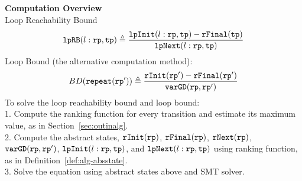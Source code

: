 \textbf{Computation Overview}
\\
 Loop Reachability Bound
\[
  \mathtt{lpRB}(l: \mathtt{rp}, \mathtt{tp}) \triangleq
    \frac{\mathtt{lpInit}(l: \mathtt{rp}, \mathtt{tp}) - \mathtt{rFinal}(\mathtt{tp})}{\mathtt{lpNext}(l: \mathtt{rp}, \mathtt{tp})}
\]
 Loop Bound (the alternative computation method):
  \[
    BD(\mathtt{repeat}(\mathtt{rp}')) \triangleq
    \frac{\mathtt{rInit}(\mathtt{rp}') - \mathtt{rFinal}(\mathtt{rp}')}{\mathtt{varGD}(\mathtt{rp}, \mathtt{rp}')}
\]
  To solve the loop reachability bound and loop bound:
  \\
  1. Compute the ranking function for every transition and estimate its maximum value, as in Section~\ref{sec:outinalg}.
  \\
  2. Compute the abstract states,
  $\mathtt{rInit}(\mathtt{rp})$, $\mathtt{rFinal}(\mathtt{rp})$, $\mathtt{rNext}(\mathtt{rp})$, $\mathtt{varGD}(\mathtt{rp}, \mathtt{rp}')$, 
  $\mathtt{lpInit}(l: \mathtt{rp}, \mathtt{tp})$, and $\mathtt{lpNext}(l: \mathtt{rp}, \mathtt{tp})$ using ranking function,
  as in Definition~\ref{def:alg-absstate}.
  \\
  3. Solve the equation using abstract states above and SMT solver.
